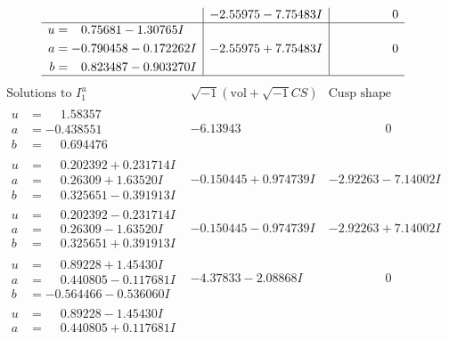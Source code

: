 \documentclass[1p]{elsarticle_modified}
\theoremstyle{definition}
\newcommand{\I}{\sqrt{-1}}
\begin{document}
$$\begin{array}{c|c|c}
 & -2.55975 - 7.75483 I & \phantom{-0.000000 } 0 \\ \hline\begin{aligned}
u &= \phantom{-}0.75681 - 1.30765 I \\
a &= -0.790458 - 0.172262 I \\
b &= \phantom{-}0.823487 - 0.903270 I\end{aligned}
 & -2.55975 + 7.75483 I & \phantom{-0.000000 } 0\\
 \hline 
 \end{array}$$\newpage$$\begin{array}{c|c|c}  
\text{Solutions to }I^u_{1}& \I (\text{vol} + \sqrt{-1}CS) & \text{Cusp shape}\\
 \hline 
\begin{aligned}
u &= \phantom{-}1.58357\phantom{ +0.000000I} \\
a &= -0.438551\phantom{ +0.000000I} \\
b &= \phantom{-}0.694476\phantom{ +0.000000I}\end{aligned}
 & -6.13943\phantom{ +0.000000I} & \phantom{-0.000000 } 0 \\ \hline\begin{aligned}
u &= \phantom{-}0.202392 + 0.231714 I \\
a &= \phantom{-}0.26309 + 1.63520 I \\
b &= \phantom{-}0.325651 - 0.391913 I\end{aligned}
 & -0.150445 + 0.974739 I & -2.92263 - 7.14002 I \\ \hline\begin{aligned}
u &= \phantom{-}0.202392 - 0.231714 I \\
a &= \phantom{-}0.26309 - 1.63520 I \\
b &= \phantom{-}0.325651 + 0.391913 I\end{aligned}
 & -0.150445 - 0.974739 I & -2.92263 + 7.14002 I \\ \hline\begin{aligned}
u &= \phantom{-}0.89228 + 1.45430 I \\
a &= \phantom{-}0.440805 - 0.117681 I \\
b &= -0.564466 - 0.536060 I\end{aligned}
 & -4.37833 - 2.08868 I & \phantom{-0.000000 } 0 \\ \hline\begin{aligned}
u &= \phantom{-}0.89228 - 1.45430 I \\
a &= \phantom{-}0.440805 + 0.117681 I \\

\end{aligned}
\end{array}$$
\end{document}
